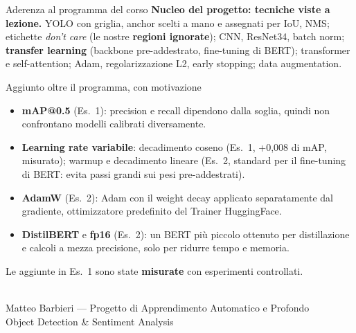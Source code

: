\documentclass[aspectratio=169]{beamer}
\begin{document}
\begin{frame}{Aderenza al programma del corso}
  \footnotesize
  \textbf{Nucleo del progetto: tecniche viste a lezione.} YOLO con griglia, anchor
  scelti a mano e assegnati per IoU, NMS; etichette \emph{don't care} (le nostre
  \textbf{regioni ignorate}); CNN, ResNet34, batch norm; \textbf{transfer learning}
  (backbone pre-addestrato, fine-tuning di BERT); transformer e self-attention;
  Adam, regolarizzazione L2, early stopping; data augmentation.
  \begin{block}{Aggiunto oltre il programma, con motivazione}
    \begin{itemize}
      \setlength{\itemsep}{1pt}
      \item \textbf{mAP@0.5} (Es.\ 1): precision e recall dipendono dalla soglia,
            quindi non confrontano modelli calibrati diversamente.
      \item \textbf{Learning rate variabile}: decadimento coseno (Es.\ 1, +0,008 di
            mAP, misurato); warmup e decadimento lineare (Es.\ 2, standard per il
            fine-tuning di BERT: evita passi grandi sui pesi pre-addestrati).
      \item \textbf{AdamW} (Es.\ 2): Adam con il weight decay applicato separatamente
            dal gradiente, ottimizzatore predefinito del Trainer HuggingFace.
      \item \textbf{DistilBERT} e \textbf{fp16} (Es.\ 2): un BERT più piccolo
            ottenuto per distillazione e calcoli a mezza precisione, solo per
            ridurre tempo e memoria.
    \end{itemize}
  \end{block}
  \vspace{-2pt}
  \begin{center}
    Le aggiunte in Es.\ 1 sono state \textbf{misurate} con esperimenti controllati.
  \end{center}
\end{frame}

\begin{frame}[plain]
  \begin{center}
    {\Large{}}\\[0.6cm]
    {\normalsize Matteo Barbieri --- Progetto di Apprendimento Automatico e Profondo}\\[0.2cm]
    {\small Object Detection \& Sentiment Analysis}
  \end{center}
\end{frame}
\end{document}
